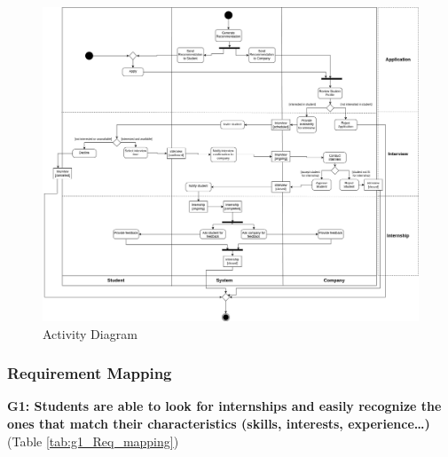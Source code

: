 \begin{figure}[H]
\centering
\includegraphics[width=\textwidth]{Images/activity-diagram.png}
\caption{\label{fig:activity_diagram} Activity Diagram}
\end{figure}


\subsubsection{Requirement Mapping}
\textbf{G1: Students are able to look for internships and easily recognize the ones that match their characteristics (skills, interests, experience…)} (Table \ref{tab:g1_Req_mapping})

